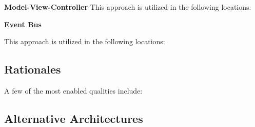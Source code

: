 \textbf{Model-View-Controller}
This approach is utilized in the following locations:
\begin{itemize}
\end{itemize}


\textbf{Event Bus}

This approach is utilized in the following locations:
\begin{itemize}
\end{itemize}


\subsection{Rationales}
A few of the most enabled qualities include:

\begin{itemize}
\end{itemize}

\subsection{Alternative Architectures}

